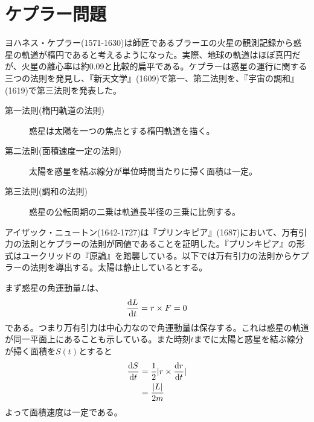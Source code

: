 \section{ケプラー問題}
	ヨハネス・ケプラー(1571-1630)は師匠であるブラーエの火星の観測記録から惑星の軌道が楕円であると考えるようになった。実際、地球の軌道はほぼ真円だが、火星の離心率は約0.09と比較的扁平である。ケプラーは惑星の運行に関する三つの法則を発見し、『新天文学』(1609)で第一、第二法則を、『宇宙の調和』(1619)で第三法則を発表した。
	\begin{description}
		\item[第一法則(楕円軌道の法則)] 惑星は太陽を一つの焦点とする楕円軌道を描く。
		\item[第二法則(面積速度一定の法則)] 太陽を惑星を結ぶ線分が単位時間当たりに掃く面積は一定。
		\item[第三法則(調和の法則)] 惑星の公転周期の二乗は軌道長半径の三乗に比例する。
	\end{description}
	アイザック・ニュートン(1642-1727)は『プリンキピア』(1687)において、万有引力の法則とケプラーの法則が同値であることを証明した。『プリンキピア』の形式はユークリッドの『原論』を踏襲している。以下では万有引力の法則からケプラーの法則を導出する。太陽は静止しているとする。
    
	まず惑星の角運動量$L$は、
		\[\de[L]{t} = r \times F = 0\]
	である。つまり万有引力は中心力なので角運動量は保存する。これは惑星の軌道が同一平面上にあることも示している。また時刻$t$までに太陽と惑星を結ぶ線分が掃く面積を$S(t)$とすると
	\begin{align*}
		\de[S]{t} &= \frac{1}{2}|r \times \de[r]{t}|\\
		          &= \frac{|L|}{2m}
	\end{align*}
	よって面積速度は一定である。

